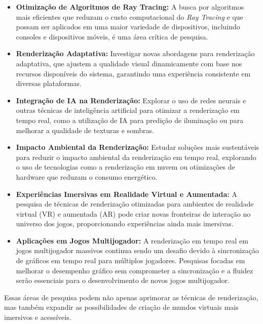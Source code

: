 \begin{itemize}
    \item \textbf{Otimização de Algoritmos de Ray Tracing:} A busca por algoritmos mais eficientes que reduzam o custo computacional do \textit{Ray Tracing} e que possam ser aplicados em uma maior variedade de dispositivos, incluindo consoles e dispositivos móveis, é uma área crítica de pesquisa.
    
    \item \textbf{Renderização Adaptativa:} Investigar novas abordagens para renderização adaptativa, que ajustem a qualidade visual dinamicamente com base nos recursos disponíveis do sistema, garantindo uma experiência consistente em diversas plataformas.
    
    \item \textbf{Integração de IA na Renderização:} Explorar o uso de redes neurais e outras técnicas de inteligência artificial para otimizar a renderização em tempo real, como a utilização de IA para predição de iluminação ou para melhorar a qualidade de texturas e sombras.
    
    \item \textbf{Impacto Ambiental da Renderização:} Estudar soluções mais sustentáveis para reduzir o impacto ambiental da renderização em tempo real, explorando o uso de tecnologias como a renderização em nuvem ou otimizações de hardware que reduzam o consumo energético.
    
    \item \textbf{Experiências Imersivas em Realidade Virtual e Aumentada:} A pesquisa de técnicas de renderização otimizadas para ambientes de realidade virtual (VR) e aumentada (AR) pode criar novas fronteiras de interação no universo dos jogos, proporcionando experiências ainda mais imersivas.
    
    \item \textbf{Aplicações em Jogos Multijogador:} A renderização em tempo real em jogos multijogador massivos continua sendo um desafio devido à sincronização de gráficos em tempo real para múltiplos jogadores. Pesquisas focadas em melhorar o desempenho gráfico sem comprometer a sincronização e a fluidez serão essenciais para o desenvolvimento de novos jogos multijogador.
\end{itemize}

Essas áreas de pesquisa podem não apenas aprimorar as técnicas de renderização, mas também expandir as possibilidades de criação de mundos virtuais mais imersivos e acessíveis.


